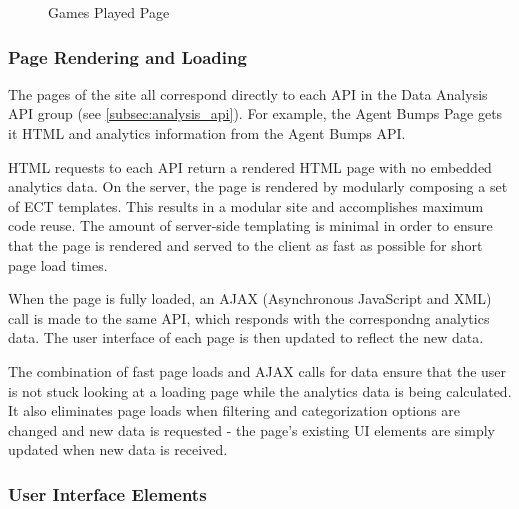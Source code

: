 \begin{figure}[H]
	\caption{\label{fig:games_played} Games Played Page}
\end{figure}

\subsubsection{Page Rendering and Loading}

The pages of the site all correspond directly to each API in the Data Analysis API group (see \ref{subsec:analysis_api}). For example, the Agent Bumps Page gets it HTML and analytics information from the Agent Bumps API.

HTML requests to each API return a rendered HTML page with no embedded analytics data. On the server, the page is rendered by modularly composing a set of ECT templates. This results in a modular site and accomplishes maximum code reuse. The amount of server-side templating is minimal in order to ensure that the page is rendered and served to the client as fast as possible for short page load times.

When the page is fully loaded, an AJAX (Asynchronous JavaScript and XML) call is made to the same API, which responds with the correspondng analytics data. The user interface of each page is then updated to reflect the new data. 

The combination of fast page loads and AJAX calls for data ensure that the user is not stuck looking at a loading page while the analytics data is being calculated. It also eliminates page loads when filtering and categorization options are changed and new data is requested - the page's existing UI elements are simply updated when new data is received.

\subsubsection{User Interface Elements}

